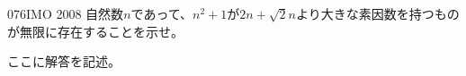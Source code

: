 \begin{thm}{076}{}{IMO 2008}
 自然数$n$であって、$n^2+1$が$2n+\sqrt{2}n$より大きな素因数を持つものが無限に存在することを示せ。
\end{thm}

ここに解答を記述。